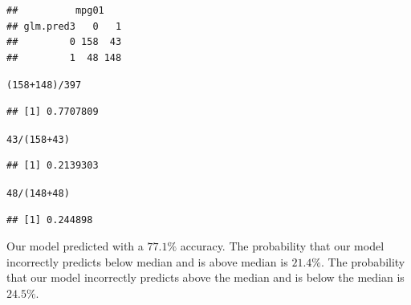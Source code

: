 \documentclass{article}\usepackage[]{graphicx}\usepackage[]{color}
\makeatletter
\newcommand{\hlnum}[1]{\textcolor[rgb]{0.686,0.059,0.569}{#1}}%
\newcommand{\hlopt}[1]{\textcolor[rgb]{0,0,0}{#1}}%
\newcommand{\hlstd}[1]{\textcolor[rgb]{0.345,0.345,0.345}{#1}}%
\newenvironment{kframe}{%
 \def\at@end@of@kframe{}%
 \ifinner\ifhmode%
  \def\at@end@of@kframe{\end{minipage}}%
  \begin{minipage}{\columnwidth}%
 \fi\fi%
 \def\FrameCommand##1{\hskip\@totalleftmargin \hskip-\fboxsep
 \colorbox{shadecolor}{##1}\hskip-\fboxsep
     \hskip-\linewidth \hskip-\@totalleftmargin \hskip\columnwidth}%
 \MakeFramed {\advance\hsize-\width
   \@totalleftmargin\z@ \linewidth\hsize
   \@setminipage}}%
 {\par\unskip\endMakeFramed%
 \at@end@of@kframe}
\newenvironment{knitrout}{}{} %
\makeatother
\begin{document}
\begin{enumerate}[(a)]
\begin{knitrout}
\begin{kframe}
\begin{verbatim}
##          mpg01
## glm.pred3   0   1
##         0 158  43
##         1  48 148
\end{verbatim}
\begin{alltt}
\hlstd{(}\hlnum{158}\hlopt{+}\hlnum{148}\hlstd{)}\hlopt{/}\hlnum{397}
\end{alltt}
\begin{verbatim}
## [1] 0.7707809
\end{verbatim}
\begin{alltt}
\hlnum{43}\hlopt{/}\hlstd{(}\hlnum{158}\hlopt{+}\hlnum{43}\hlstd{)}
\end{alltt}
\begin{verbatim}
## [1] 0.2139303
\end{verbatim}
\begin{alltt}
\hlnum{48}\hlopt{/}\hlstd{(}\hlnum{148}\hlopt{+}\hlnum{48}\hlstd{)}
\end{alltt}
\begin{verbatim}
## [1] 0.244898
\end{verbatim}
\end{kframe}
\end{knitrout}

Our model predicted with a $77.1\%$ accuracy. The probability that our model incorrectly predicts below median and is above median is $21.4\%$. The probability that our model incorrectly predicts above the median and is below the median is $24.5\%$. 

\end{enumerate}
\end{document}
